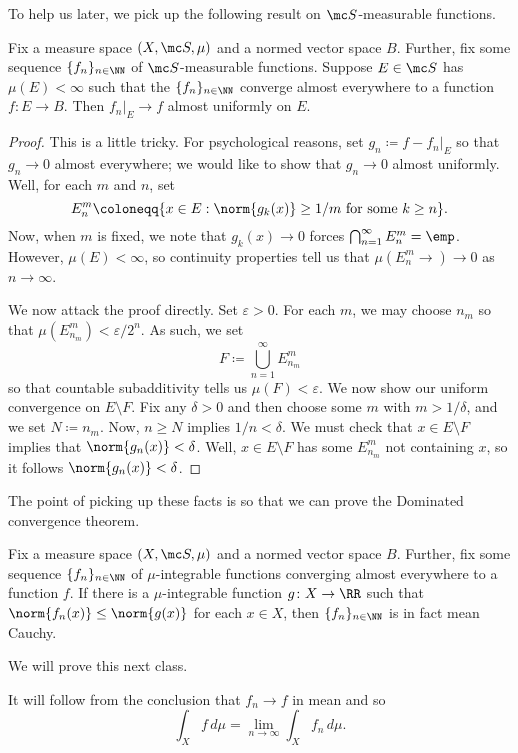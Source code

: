 \documentclass[../notes.tex]{subfiles}
\begin{document}
To help us later, we pick up the following result on $\mc S$-measurable functions.
\begin{theorem}[Egorov's]
	Fix a measure space $(X,\mc S,\mu)$ and a normed vector space $B$. Further, fix some sequence $\{f_n\}_{n\in\NN}$ of $\mc S$-measurable functions. Suppose $E\in\mc S$ has $\mu(E)<\infty$ such that the $\{f_n\}_{n\in\NN}$ converge almost everywhere to a function $f\colon E\to B$. Then $f_n|_E\to f$ almost uniformly on $E$.
\end{theorem}
\begin{proof}
	This is a little tricky. For psychological reasons, set $g_n\coloneqq f-f_n|_E$ so that $g_n\to0$ almost everywhere; we would like to show that $g_n\to0$ almost uniformly. Well, for each $m$ and $n$, set
	\[E^m_n\coloneqq\{x\in E:\norm{g_k(x)}\ge1/m\text{ for some }k\ge n\}.\]
	Now, when $m$ is fixed, we note that $g_k(x)\to0$ forces $\bigcap_{n=1}^\infty E^m_n=\emp$. However, $\mu(E)<\infty$, so continuity properties tell us that $\mu\left(E^m_n\to\right)\to0$ as $n\to\infty$. 

	We now attack the proof directly. Set $\varepsilon>0$. For each $m$, we may choose $n_m$ so that $\mu\left(E^m_{n_m}\right)<\varepsilon/2^n$. As such, we set
	\[F\coloneqq\bigcup_{n=1}^\infty E^m_{n_m}\]
	so that countable subadditivity tells us $\mu(F)<\varepsilon$. We now show our uniform convergence on $E\setminus F$. Fix any $\delta>0$ and then choose some $m$ with $m>1/\delta$, and we set $N\coloneqq n_m$. Now, $n\ge N$ implies $1/n<\delta$. We must check that $x\in E\setminus F$ implies that $\norm{g_n(x)}<\delta$. Well, $x\in E\setminus F$ has some $E^{m}_{n_m}$ not containing $x$, so it follows $\norm{g_n(x)}<\delta$.
\end{proof}
The point of picking up these facts is so that we can prove the Dominated convergence theorem.
\begin{theorem}
	Fix a measure space $(X,\mc S,\mu)$ and a normed vector space $B$. Further, fix some sequence $\{f_n\}_{n\in\NN}$ of $\mu$-integrable functions converging almost everywhere to a function $f$. If there is a $\mu$-integrable function $g\colon X\to\RR$ such that $\norm{f_n(x)}\le\norm{g(x)}$ for each $x\in X$, then $\{f_n\}_{n\in\NN}$ is in fact mean Cauchy.
\end{theorem}
We will prove this next class.
\begin{remark}
	It will follow from the conclusion that $f_n\to f$ in mean and so
	\[\int_Xf\,d\mu=\lim_{n\to\infty}\int_Xf_n\,d\mu.\]
\end{remark}
\end{document}
